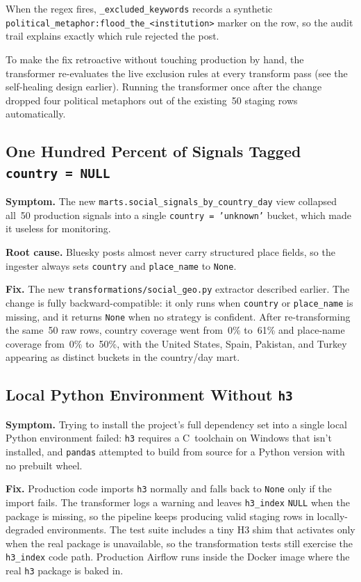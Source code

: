\documentclass[11pt]{article}
\begin{document}
When the regex fires, \texttt{\_excluded\_keywords} records a synthetic
\texttt{political\_metaphor:flood\_the\_<institution>} marker on the
row, so the audit trail explains exactly which rule rejected the post.

To make the fix retroactive without touching production by hand, the
transformer re-evaluates the live exclusion rules at every transform
pass (see the self-healing design earlier). Running the transformer
once after the change dropped four political metaphors out of the
existing~50 staging rows automatically.

\subsection{One Hundred Percent of Signals Tagged \texttt{country = NULL}}

\textbf{Symptom.} The new \texttt{marts.social\_signals\_by\_country\_day}
view collapsed all~50 production signals into a single
\texttt{country = 'unknown'} bucket, which made it useless for
monitoring.

\textbf{Root cause.} Bluesky posts almost never carry structured place
fields, so the ingester always sets \texttt{country} and
\texttt{place\_name} to \texttt{None}.

\textbf{Fix.} The new \texttt{transformations/social\_geo.py} extractor
described earlier. The change is fully backward-compatible: it only
runs when \texttt{country} or \texttt{place\_name} is missing, and it
returns \texttt{None} when no strategy is confident. After
re-transforming the same~50 raw rows, country coverage went from~0\%
to~61\% and place-name coverage from~0\% to~50\%, with the United
States, Spain, Pakistan, and Turkey appearing as distinct buckets in
the country/day mart.

\subsection{Local Python Environment Without \texttt{h3}}

\textbf{Symptom.} Trying to install the project's full dependency set
into a single local Python environment failed: \texttt{h3} requires a
C~toolchain on Windows that isn't installed, and \texttt{pandas}
attempted to build from source for a Python version with no prebuilt
wheel.

\textbf{Fix.} Production code imports \texttt{h3} normally and falls
back to \texttt{None} only if the import fails. The transformer logs
a warning and leaves \texttt{h3\_index} \texttt{NULL} when the package
is missing, so the pipeline keeps producing valid staging rows in
locally-degraded environments. The test suite includes a tiny H3 shim
that activates only when the real package is unavailable, so the
transformation tests still exercise the \texttt{h3\_index} code path.
Production Airflow runs inside the Docker image where the real
\texttt{h3} package is baked in.
\end{document}
